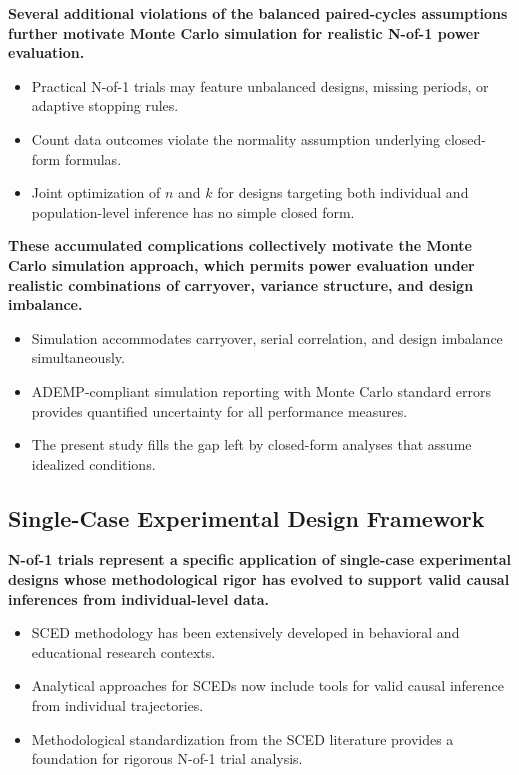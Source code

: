 \documentclass[
  11pt,
]{article}
\begin{document}
\textbf{Several additional violations of the balanced paired-cycles assumptions further motivate Monte Carlo simulation for realistic N-of-1 power evaluation.}

\begin{itemize}\setlength{\itemsep}{2pt}\setlength{\parskip}{0pt}
\item Practical N-of-1 trials may feature unbalanced designs, missing periods, or adaptive stopping rules.
\item Count data outcomes violate the normality assumption underlying closed-form formulas.
\item Joint optimization of $n$ and $k$ for designs targeting both individual and population-level inference has no simple closed form.
\end{itemize}

\textbf{These accumulated complications collectively motivate the Monte Carlo simulation approach, which permits power evaluation under realistic combinations of carryover, variance structure, and design imbalance.}

\begin{itemize}\setlength{\itemsep}{2pt}\setlength{\parskip}{0pt}
\item Simulation accommodates carryover, serial correlation, and design imbalance simultaneously.
\item ADEMP-compliant simulation reporting with Monte Carlo standard errors provides quantified uncertainty for all performance measures.
\item The present study fills the gap left by closed-form analyses that assume idealized conditions.
\end{itemize}

\subsection{Single-Case Experimental Design Framework}\label{single-case-experimental-design-framework}

\textbf{N-of-1 trials represent a specific application of single-case experimental designs whose methodological rigor has evolved to support valid causal inferences from individual-level data.}

\begin{itemize}\setlength{\itemsep}{2pt}\setlength{\parskip}{0pt}
\item SCED methodology has been extensively developed in behavioral and educational research contexts.
\item Analytical approaches for SCEDs now include tools for valid causal inference from individual trajectories.
\item Methodological standardization from the SCED literature provides a foundation for rigorous N-of-1 trial analysis.
\end{itemize}
\end{document}
